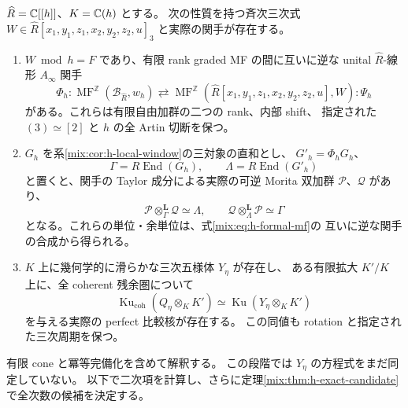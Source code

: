 \begin{theorem}[交換子族の形式比較と一般点の可換 Ku 核]
\label{mix:thm:h-formal-kernel}
$\widehat R=\mathbb C[[h]]$、$K=\mathbb C(h)$ とする。
次の性質を持つ斉次三次式
$W\in\widehat R[x_1,y_1,z_1,x_2,y_2,z_2,u]_3$ と実際の関手が存在する。
\begin{enumerate}[label=\textnormal{(\roman*)}]
\item $W\bmod h=F$ であり、有限 rank graded MF の間に互いに逆な
      unital $\widehat R$-線形 $A_\infty$ 関手
\begin{equation}\label{mix:eq:h-formal-mf}
 \Phi_h:\operatorname{MF}^{\mathbb Z}(\mathscr B_{\widehat R},w_h)
 \rightleftarrows
 \operatorname{MF}^{\mathbb Z}(\widehat R[x_1,y_1,z_1,x_2,y_2,z_2,u],W):\Psi_h
\end{equation}
      がある。これらは有限自由加群の二つの rank、内部 shift、
      指定された $(3)\simeq[2]$ と $h$ の全 Artin 切断を保つ。
\item $G_h$ を系\ref{mix:cor:h-local-window}の三対象の直和とし、
      $G'_h=\Phi_hG_h$、
\[
 \Gamma=R\operatorname{End}(G_h),\qquad
 \Lambda=R\operatorname{End}(G'_h)
\]
      と置くと、関手の Taylor 成分による実際の可逆 Morita 双加群
      $\mathcal P$、$\mathcal Q$ があり、
\begin{equation}\label{mix:eq:h-graph-unit-counit}
 \mathcal P\otimes_\Gamma^{\mathbf L}\mathcal Q\simeq\Lambda,
 \qquad
 \mathcal Q\otimes_\Lambda^{\mathbf L}\mathcal P\simeq\Gamma
\end{equation}
      となる。これらの単位・余単位は、式\eqref{mix:eq:h-formal-mf}の
      互いに逆な関手の合成から得られる。
\item $K$ 上に幾何学的に滑らかな三次五様体 $Y_\eta$ が存在し、
      ある有限拡大 $K'/K$ 上に、全 coherent 残余圏について
\begin{equation}\label{mix:eq:h-generic-ku}
  \operatorname{Ku}_{\mathrm{coh}}(Q_\eta\otimes_KK')
       \simeq\operatorname{Ku}(Y_\eta\otimes_KK')
\end{equation}
      を与える実際の perfect 比較核が存在する。
      この同値も rotation と指定された三次周期を保つ。
\end{enumerate}
有限 cone と冪等完備化を含めて解釈する。
この段階では $Y_\eta$ の方程式をまだ同定していない。
以下で二次項を計算し、さらに定理\ref{mix:thm:h-exact-candidate}で全次数の候補を決定する。
\end{theorem}

